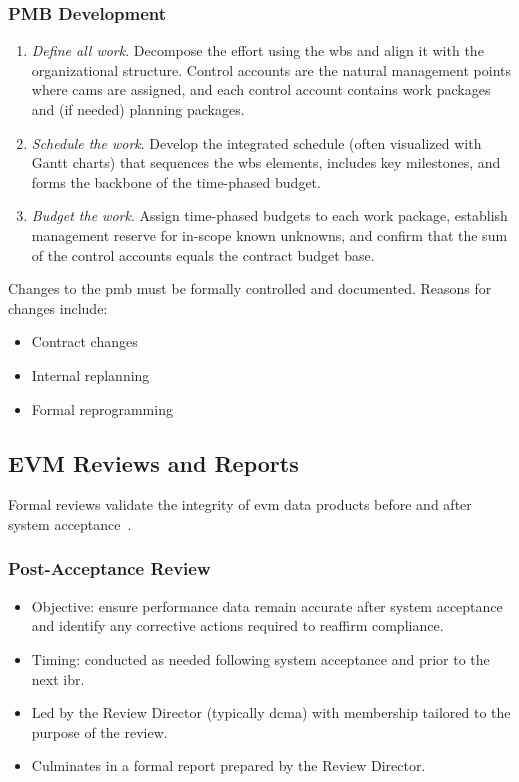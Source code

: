 \documentclass[../main.tex]{subfiles}
\begin{document}
\subsubsection{PMB Development}
\begin{enumerate}
  \item[Step 1:] \emph{Define all work}. Decompose the effort using the \ac{wbs} and align it with the organizational structure. Control accounts are the natural management points where \acp{cam} are assigned, and each control account contains work packages and (if needed) planning packages.
  \item[Step 2:] \emph{Schedule the work}. Develop the integrated schedule (often visualized with Gantt charts) that sequences the \ac{wbs} elements, includes key milestones, and forms the backbone of the time-phased budget.
  \item[Step 3:] \emph{Budget the work}. Assign time-phased budgets to each work package, establish management reserve for in-scope known unknowns, and confirm that the sum of the control accounts equals the contract budget base.
\end{enumerate}
Changes to the \ac{pmb} must be formally controlled and documented. Reasons for changes include:
\begin{itemize}
  \item Contract changes
  \item Internal replanning
  \item Formal reprogramming
\end{itemize}

\subsection{EVM Reviews and Reports}
Formal reviews validate the integrity of \ac{evm} data products before and after system acceptance~\autocite{edo-3-6-1-evm-intro-2025,DoD-IPM-EVM-Definitions-2026,DoD-IPM-Policy-Guidance-2026}.
\subsubsection{Post-Acceptance Review}
\begin{itemize}
  \item Objective: ensure performance data remain accurate after system acceptance and identify any corrective actions required to reaffirm compliance.
  \item Timing: conducted as needed following system acceptance and prior to the next \ac{ibr}.
  \item Led by the Review Director (typically \ac{dcma}) with membership tailored to the purpose of the review.
  \item Culminates in a formal report prepared by the Review Director.
\end{itemize}
\end{document}
